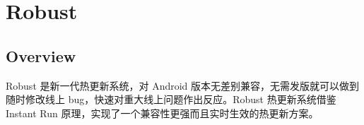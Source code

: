 \part{Robust}

\chapter{Overview}

Robust 是新一代热更新系统，对 Android 版本无差别兼容，无需发版就可以做到随时修改线上 bug，快速对重大线上问题作出反应。Robust 热更新系统借鉴 Instant Run 原理，实现了一个兼容性更强而且实时生效的热更新方案。
